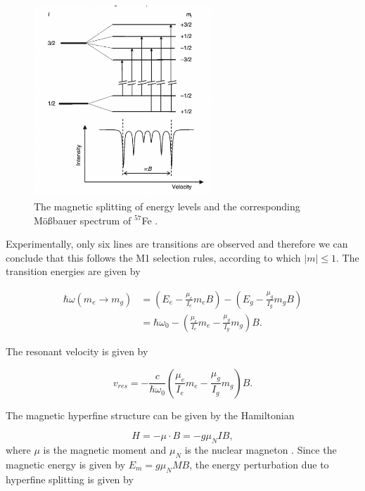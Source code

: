 \documentclass[a4paper]{report}
\numberwithin{equation}{section}
\begin{document}
\begin{figure}[htpb]
    \centering
    \includegraphics[width=0.6\textwidth]{dipole}
    \caption{The magnetic splitting of energy levels and the corresponding M\"o{\ss}bauer spectrum of $^{57}$Fe \cite{Kuzmann2011}.}
    \label{fig:dipole}
\end{figure}

Experimentally, only six lines are transitions are observed and therefore we can conclude that this follows the M1 selection rules, according to which $|m| \leq 1$. The transition energies are given by

\begin{align}
		\hbar \omega (m_{e} \rightarrow m_{g})  &= \left(E_{e} - \frac{\mu_{e}}{I_{e}} m _{e} B \right) - \left( E_{g} - \frac{\mu _{g}}{I_{g}}m _{g} B \right) \\
												&= \hbar \omega _{0} - \left(\frac{\mu _{e}}{I_{e}} m _{e} - \frac{\mu _{g}}{I_{g}}m _{g} \right) B.
\end{align}

The resonant velocity is given by

\begin{equation}
		v_{res} = - \frac{c}{\hbar \omega _{0}} \left(\frac{\mu _{e}}{I_{e}} m _{e} - \frac{\mu _{g}}{I_{g}} m _{g} \right) B.
\end{equation}

The magnetic hyperfine structure can be given by the Hamiltonian

\begin{equation}
		H = - \mu \cdot B = -g \mu _{N} I B,
\end{equation}
where $\mu$ is the magnetic moment and  $\mu _{N}$ is the nuclear magneton \cite{Kuzmann2011}. Since the magnetic energy is given by $E_{m} = g \mu _{N} M B$, the energy perturbation due to hyperfine splitting is given by 
\end{document}

